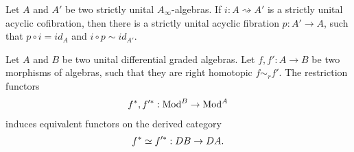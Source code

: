 \documentclass[../thesis.tex]{subfiles}
\begin{document}
            \begin{lemma}{{\cite[Proposition 3.2.4.5][106]{LefevreHasegawa03}}}\label{lem: inf-cofib-is-split}
                Let $A$ and $A'$ be two strictly unital $A_\infty$-algebras. If $i : A \rightsquigarrow A'$ is a strictly unital acyclic cofibration, then there is a strictly unital acyclic fibration $p : A' \rightarrow A$, such that $p\circ i = id_A$ and $i \circ p \sim id_{A'}$.
            \end{lemma}

            \begin{lemma}\label{lem: homotopic-mor-is-same}
                Let $A$ and $B$ be two unital differential graded algebras. Let $f, f' : A \rightarrow B$ be two morphisms of algebras, such that they are right homotopic $f \sim_r f'$. The restriction functors
                \begin{align}
                    f^*, f'^* : \tt{Mod}^B \rightarrow \tt{Mod}^A
                \end{align}
                induces equivalent functors on the derived category
                \begin{align*}
                    f^* \simeq f'^* : DB \rightarrow DA\tt{.}
                \end{align*}
            \end{lemma}
\end{document}
